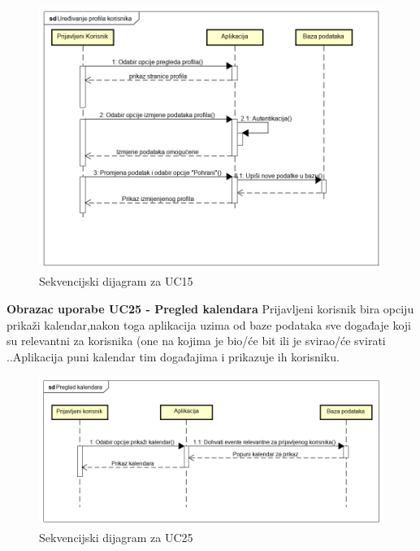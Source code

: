 				
				\begin{figure}[H]
					\begin{center}
						\includegraphics[width=15cm]{slike/uc15_fixed.PNG}
					\end{center}
					\caption{Sekvencijski dijagram za UC15}
					\label{fig:uc15}
				\end{figure}
				
				
				
			\eject
				 \textbf{Obrazac uporabe UC25 - Pregled kalendara}
			\newline
			{Prijavljeni korisnik bira opciju prikaži kalendar,nakon toga aplikacija uzima od baze podataka sve događaje koji su relevantni za korisnika (one na kojima je bio/će bit ili je svirao/će svirati  .}.Aplikacija puni kalendar tim događajima i prikazuje ih korisniku.\\
			
			\begin{figure}[H]
				\begin{center}
					\includegraphics[width=15cm]{slike/uc25.PNG}
				\end{center}
				\caption{Sekvencijski dijagram za UC25}
				\label{fig:uc25}
			\end{figure}
	
